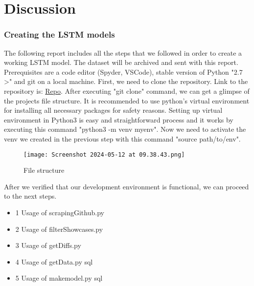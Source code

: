 \chapter{Discussion}\label{chap:discussion}


\subsection{\textbf{Creating the LSTM models}}

    The following report includes all the steps that we followed in order to create a working LSTM model. The dataset will be archived and sent with this report. Prerequisites are a code editor (Spyder, VSCode), stable version of Python "2.7 >" and git on a local machine.
    First, we need to clone the repository. Link to the repository is:
    \href{https://github.com/LauraWartschinski/VulnerabilityDetection}{Repo}. After executing "git clone" command, we can get a glimpse of the projects file structure. It is recommended to use python's virtual environment for installing all necessary packages for safety reasons.
    Setting up virtual environment in Python3 is easy and straightforward process and it works by executing this command "python3 -m venv myenv". Now we need to activate the venv we created in the previous step with this command "source path/to/env". 
    
    \begin{figure}
        \centering
        \texttt{[image: Screenshot 2024-05-12 at 09.38.43.png]}
        \caption{File structure}
        \label{fig:enter-label}
    \end{figure}

\newpage

    After we verified that our development environment is functional, we can proceed to the next steps.
    \begin{itemize}
     \item 1 Usage of scrapingGithub.py
     \item 2 Usage of filterShowcases.py
      \item 3 Usage of getDiffs.py
      \item 4 Usage of getData.py sql
       \item 5 Usage of makemodel.py sql
    \end{itemize}
    
